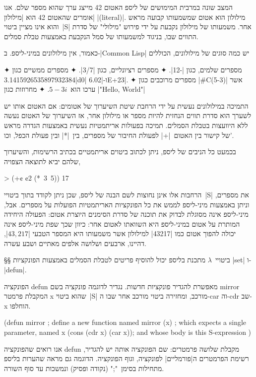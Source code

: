 המצב שונה במרבית המימושים של ליספ האטום 42 מייצג ערך שהוא מספר שלם. אנו אומרים
שהאטום 42 הוא \ע|מילולון| \E|(literal)|. מילולון הוא אטום שמשמעותו קבועה מראש
והוא אינו מציין ביטוי~\E|S| אחר. משמעותו של מילולון נקבעת על ידי פירוש "מילולי"
של סדרת התווים שבו, בניגוד למשמעותו של סמל הנקבעת באמצעות טבלת סמלים.

כאמור, אין מילולונים במיני-ליספ. ב-\E|Common Lisp| יש כמה סוגים של מילולונים,
הכוללים
\begin{enumerate}
  ✦ מספרים שלמים, כגון \T|-12|.
  ✦ מספרים רציונליים, כגון \T|3/7|.
  ✦ מספרים ממשיים כגון \T|3.1415926535897932384d0| ו-\T|6.02E+23|.
  ✦ מספרים מרוכבים כגון \T|#C(5-3)| אשר ערכו הוא~$5-3i$.
  ✦ מחרוזות כגון \T|"Hello, World"|
\end{enumerate}

התמיכה במילולונים נעשית על ידי הרחבת שיטת השיערוך של אטומים: אם האטום אותו יש
לשערך הוא סדרת תווים הנחזית להיות מספר או מילולון אחר, אז השיערוך של האטום נעשה
ללא היוועצות בטבלת הסמלים. תמיכה בפעולות אריתמטיות נעשית באמצעות הגדרה מראש של
קישור בין האטום~\T|+| לפעולת החיבור של מספרים, בין~\T|*| ובין פעולת הכפל,
וכו'.

בכמעט כל הניבים של ליספ, ניתן לכתוב ביטוים אריתמטיים בכתיב הרשימות, והשיערוך
שלהם יביא לתוצאה הצפויה,

\begin{LISP}
> (+¢ ¢2 (*~3~5))
17
\end{LISP}

הרחבות אלו אינן נחוצות לשם הבנה של ליספ, שכן ניתן לקודד בתוך ביטויי~\E|S| את
מספרים, וניתן באמצעות מיני-ליספ לממש את כל הפונקציות האריתמטיות הפועלות על
מספרים. אבל, מיני-ליספ אינה מסוגלת לבדוק את תוכנה של סדרת הסימנים היוצרת אטום:
הפעולה היחידה המותרת על אטום במיני-ליספ היא השוואתו לאטום אחר: כיוון שכך שפת
מיני-ליספ אינה יכולה להפוך אטום כמו \T|43217| למילולון אשר משמעותו היא המספר
הטבעי \E|$43,217$|, דהיינו, ארבעים ושלושה אלפים מאתיים ושבע עשרה.

§§ ביטויי~$λ$
מתכנת בליספ יכול להוסיף פריטים לטבלת הסמלים באמצעות הפונקציות \E|set|
ו-\E|defun|.

הפונקציה defun מאפשרת להגדיר פונקציות חדשות. נגדיר לדוגמה פונקציה בשם mirror
המקבלת פרמטר x שהוא ביטוי~\E|S| מורכב, ומחזירה ביטוי מורכב אחר שבו ה-car וה-cdr
שב-x הוחלפו.
\begin{LISP}
(defun mirror ; define a new function named mirror
  (x) ; which expects a single parameter, named x
  (cons (cdr x) (car x)); and whose body is this S-expression
)
\end{LISP}
אנו רואים שהפונקציה defun מקבלת שלושה פרמטרים: שם הפונקציה אותה יש להגדיר,
רשימת הפרמטרים ה\ע|פורמליים| לפונקציה, וגוף הפונקציה. הדוגמה גם מראה שהערות
בליספ מתחילות בסימן~";" (נקודה ופסיק) ונמשכות עד סוף השורה.

